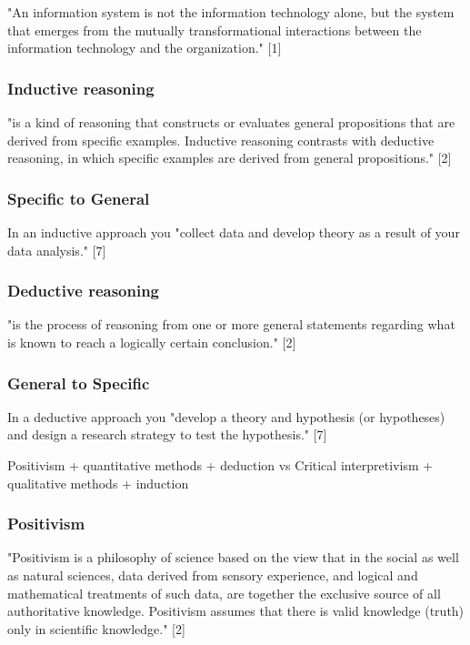 "An information system is not the information technology alone, but the system that emerges from the mutually transformational interactions between the information technology and the organization." [1]

\subsubsection{Inductive reasoning}

"is a kind of reasoning that constructs or evaluates general propositions that are derived from specific examples. Inductive reasoning contrasts with deductive reasoning, in which specific examples are derived from general propositions." [2]

\subsubsection{Specific to General}

In an inductive approach you "collect data and develop theory as a result of your data analysis." [7]

\subsubsection{Deductive reasoning}

"is the process of reasoning from one or more general statements regarding what is known to reach a logically certain conclusion." [2]

\subsubsection{General to Specific}

In a deductive approach you "develop a theory and hypothesis (or hypotheses) and design a research strategy to test the hypothesis." [7]

Positivism + quantitative methods + deduction
vs
Critical interpretivism + qualitative methods + induction

\subsubsection{Positivism}

"Positivism is a philosophy of science based on the view that in the social as well as natural sciences, data derived from sensory experience, and logical and mathematical treatments of such data, are together the exclusive source of all authoritative knowledge. Positivism assumes that there is valid knowledge (truth) only in scientific knowledge." [2]

